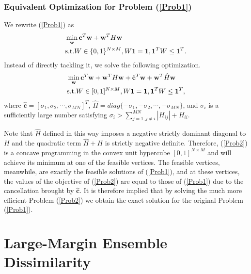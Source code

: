 \documentclass[10pt,twocolumn,letterpaper]{article}
\begin{document}
\subsubsection{Equivalent Optimization for Problem (\ref{Prob1})}
\label{proof}

We rewrite (\ref{Prob1}) as
\begin{equation}
\begin{split}
&\min_{\mathbf{w}}\mathbf{c}^{T}\mathbf{w}+\mathbf{w}^{T}H\mathbf{w}\\
&\textup{s.t.} W\in\{0,1\}^{N\times M}, W\mathbf{1}=\mathbf{1}, \mathbf{1}^{T}W\leq\mathbf{1}^{T}.
\end{split}
\end{equation}
Instead of directly tackling it, we solve the following optimization.
\begin{equation}
\label{Prob2}
\begin{split}
&\min_{\mathbf{w}}\mathbf{c}^{T}\mathbf{w}+\mathbf{w}^{T}H\mathbf{w}+\hat{\mathbf{c}}^{T}\mathbf{w}+\mathbf{w}^{T}\hat{H}\mathbf{w}\\
&\textup{s.t.}  W \in[0,1]^{N\times M}, W\mathbf{1}=\mathbf{1}, \mathbf{1}^{T}W\leq\mathbf{1}^{T},
\end{split}
\end{equation}
where $\hat{\mathbf{c}}=[\sigma_{1},\sigma_{2},\cdots,\sigma_{MN}]^{T}$, $\hat{H}=diag\{-\sigma_{1},-\sigma_{2},\cdots,-\sigma_{MN}\}$, and $\sigma_{i}$ is a sufficiently large number satisfying $\sigma_{i}>\sum^{MN}_{j=1,j\neq i}|H_{ij}|+H_{ii}$.

Note that $\hat{H}$ defined in this way imposes a negative strictly dominant diagonal to $H$ and the quadratic term $\hat{H}+H$ is strictly negative definite. Therefore, (\ref{Prob2}) is a concave programming in the convex unit hypercube $[0,1]^{N\times M}$ and will achieve its minimum at one of the feasible vertices. The feasible vertices, meanwhile, are exactly the feasible solutions of (\ref{Prob1}), and at these vertices, the values of the objective of (\ref{Prob2}) are equal to those of (\ref{Prob1}) due to the cancellation brought by $\hat{\mathbf{c}}$. It is therefore implied that by solving the much more efficient Problem (\ref{Prob2}) we obtain the exact solution for the original Problem (\ref{Prob1}).


\section{Large-Margin Ensemble Dissimilarity}
\label{MetLearn}
\end{document}
